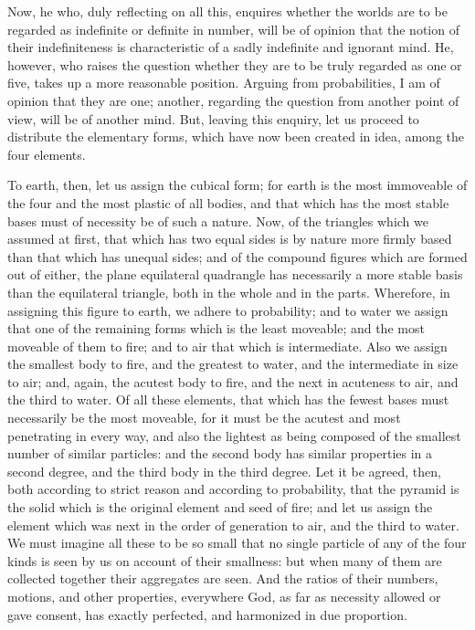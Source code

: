 Now, he who, duly reflecting on all this, enquires whether the worlds are
to be regarded as indefinite or definite in number, will be of opinion
that the notion of their indefiniteness is characteristic of a sadly
indefinite and ignorant mind. He, however, who raises the question whether
they are to be truly regarded as one or five, takes up a more reasonable
position. Arguing from probabilities, I am of opinion that they are one;
another, regarding the question from another point of view, will be of
another mind. But, leaving this enquiry, let us proceed to distribute the
elementary forms, which have now been created in idea, among the four
elements.

To earth, then, let us assign the cubical form; for earth is the most
immoveable of the four and the most plastic of all bodies, and that which
has the most stable bases must of necessity be of such a nature. Now, of
the triangles which we assumed at first, that which has two equal sides is
by nature more firmly based than that which has unequal sides; and of the
compound figures which are formed out of either, the plane equilateral
quadrangle has necessarily a more stable basis than the equilateral
triangle, both in the whole and in the parts. Wherefore, in assigning this
figure to earth, we adhere to probability; and to water we assign that one
of the remaining forms which is the least moveable; and the most moveable
of them to fire; and to air that which is intermediate. Also we assign the
smallest body to fire, and the greatest to water, and the intermediate in
size to air; and, again, the acutest body to fire, and the next in
acuteness to air, and the third to water. Of all these elements, that
which has the fewest bases must necessarily be the most moveable, for it
must be the acutest and most penetrating in every way, and also the
lightest as being composed of the smallest number of similar particles:
and the second body has similar properties in a second degree, and the
third body in the third degree. Let it be agreed, then, both according to
strict reason and according to probability, that the pyramid is the solid
which is the original element and seed of fire; and let us assign the
element which was next in the order of generation to air, and the third to
water. We must imagine all these to be so small that no single particle of
any of the four kinds is seen by us on account of their smallness: but
when many of them are collected together their aggregates are seen. And
the ratios of their numbers, motions, and other properties, everywhere
God, as far as necessity allowed or gave consent, has exactly perfected,
and harmonized in due proportion.

